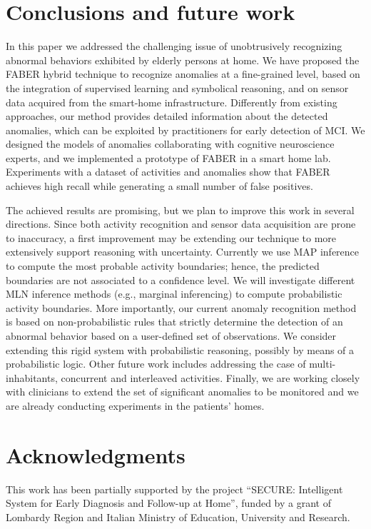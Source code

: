 \documentclass[10pt, conference, compsocconf]{IEEEtran}
\begin{document}
%


\section{Conclusions and future work}
\label{sec:conclusions}
In this paper we addressed the challenging issue of unobtrusively
recognizing abnormal behaviors exhibited by elderly persons at
home. We have proposed the FABER hybrid technique to recognize anomalies 
at a fine-grained level, based on the integration of supervised learning 
and symbolical reasoning, and on sensor data acquired from the smart-home
infrastructure. Differently from existing approaches, our method provides
detailed information about the detected anomalies, which can be
exploited by practitioners for early detection of MCI. 
We designed the models of anomalies collaborating with cognitive 
neuroscience experts, and we implemented a 
prototype of FABER in a smart home lab. Experiments with a 
dataset of activities and anomalies show that FABER achieves high recall 
while generating a small number of false positives.

The achieved results are promising, but we plan to improve this work
in several directions. 
Since both activity recognition and sensor data acquisition are prone to 
inaccuracy, a first improvement may be extending our technique to more 
extensively support reasoning with uncertainty. Currently we use MAP 
inference to compute the most probable activity boundaries; hence, the 
predicted boundaries are not associated to a confidence level. We will 
investigate different MLN inference methods (e.g., marginal inferencing) 
to compute probabilistic activity boundaries. More importantly, our 
current anomaly recognition method is based on non-probabilistic rules 
that strictly determine the detection of an abnormal behavior based on a 
user-defined set of observations. We consider extending this rigid 
system with probabilistic reasoning, possibly by means
of a probabilistic logic. Other future work includes addressing the case of multi-inhabitants,
concurrent and interleaved activities. 
Finally, we are working closely with clinicians to extend the set of 
significant anomalies to be monitored and we are already conducting 
experiments in the patients' homes.
 


\section*{Acknowledgments}
This work has been partially supported by the project 
``SECURE: Intelligent System for Early Diagnosis and Follow-up 
at Home'', funded by a grant of Lombardy Region and Italian 
Ministry of Education, University and Research.
\end{document}
